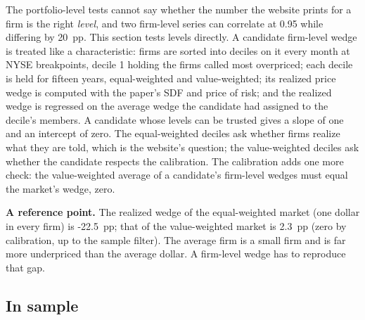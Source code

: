 \documentclass[11pt]{article}
\begin{document}
The portfolio-level tests cannot say whether the number the website prints
for a firm is the right \emph{level}, and two firm-level series can
correlate at 0.95 while differing by 20~pp. This section tests levels
directly. A candidate firm-level wedge is
treated like a characteristic: firms are sorted into deciles on it every
month at NYSE breakpoints, decile 1 holding the firms called most
overpriced; each decile is held for fifteen years, equal-weighted and
value-weighted; its realized price wedge is computed with the paper's SDF
and price of risk; and the realized wedge is regressed on the average wedge
the candidate had assigned to the decile's members. A candidate whose levels
can be trusted gives a slope of one and an intercept of zero. The
equal-weighted deciles ask whether firms realize what they are told, which is
the website's question; the value-weighted deciles ask whether the candidate
respects the calibration. The calibration adds one more check: the
value-weighted average of a candidate's firm-level wedges must equal the
market's wedge, zero.

\textbf{A reference point.} The realized wedge of the equal-weighted market
(one dollar in every firm) is -22.5~pp; that of the value-weighted market is
2.3~pp (zero by calibration, up to the sample filter). The average firm is a
small firm and is far more underpriced than the average dollar. A firm-level
wedge has to reproduce that gap.

\subsection*{In sample}
\end{document}
